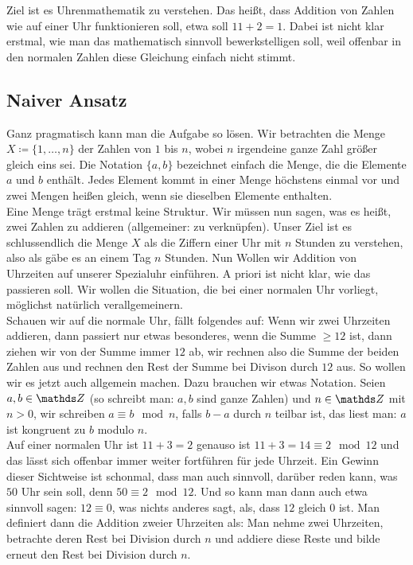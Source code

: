 Ziel ist es \glqq Uhrenmathematik\grqq{} zu verstehen. Das heißt, 
dass Addition von Zahlen wie auf einer Uhr funktionieren soll, etwa soll $11+2=1$. Dabei ist nicht klar erstmal,
wie man das mathematisch sinnvoll bewerkstelligen soll, weil offenbar in den \glqq normalen\grqq{} Zahlen diese Gleichung einfach nicht stimmt.
\subsection*{Naiver Ansatz}
Ganz pragmatisch kann man die Aufgabe so lösen. Wir betrachten die Menge $X\coloneqq \{1,\ldots,n\}$ der Zahlen von $1$ bis $n$, wobei $n$ irgendeine ganze Zahl größer gleich eins sei.
Die Notation $\{a,b\}$ bezeichnet einfach die Menge, die die Elemente $a$ und $b$ enthält. Jedes Element kommt in einer Menge
höchstens einmal vor und zwei Mengen heißen gleich, wenn sie dieselben Elemente enthalten.
\\ Eine Menge trägt erstmal keine Struktur. Wir müssen nun sagen, was es heißt, zwei Zahlen zu addieren (allgemeiner: zu verknüpfen). 
Unser Ziel ist es schlussendlich die Menge $X$ als die Ziffern einer Uhr mit $n$ Stunden zu verstehen, also als gäbe es an einem Tag $n$ Stunden. 
Nun Wollen wir Addition von Uhrzeiten auf unserer Spezialuhr einführen. A priori ist nicht klar, wie das passieren soll. Wir wollen die Situation, die bei einer normalen Uhr vorliegt, möglichst natürlich verallgemeinern. \\
Schauen wir auf die normale Uhr, fällt folgendes auf: Wenn wir zwei Uhrzeiten addieren, dann passiert nur etwas besonderes, wenn die Summe $\ge 12$ ist, dann ziehen wir von der Summe immer $12$ ab, wir rechnen also die Summe der beiden Zahlen aus und rechnen den Rest der Summe bei Divison durch $12$ aus. 
So wollen wir es jetzt auch allgemein machen. Dazu brauchen wir etwas Notation. Seien $a,b\in \Z$ (so schreibt man: $a,b$ sind ganze Zahlen) und $n\in \Z$ mit $n>0$, wir schreiben $a\equiv b \mod n$, falls $b-a$ durch $n$ teilbar ist, das liest man: $a$ ist kongruent zu $b$ modulo $n$. \\
Auf einer normalen Uhr ist $11+3=2$ genauso ist $11+3=14\equiv 2 \mod 12$ und das lässt sich offenbar immer weiter fortführen für jede Uhrzeit. Ein Gewinn dieser Sichtweise ist schonmal, dass man auch sinnvoll, darüber reden kann, was $50$ Uhr sein soll, denn $50\equiv 2 \mod 12$. Und so kann man dann auch etwa sinnvoll sagen: $12\equiv 0$, was nichts anderes sagt, als, dass $12$ gleich $0$ ist. 
Man definiert dann die Addition zweier Uhrzeiten als: Man nehme zwei Uhrzeiten, betrachte deren Rest bei Division durch $n$ und addiere diese Reste und bilde erneut den Rest bei Division durch $n$. 
